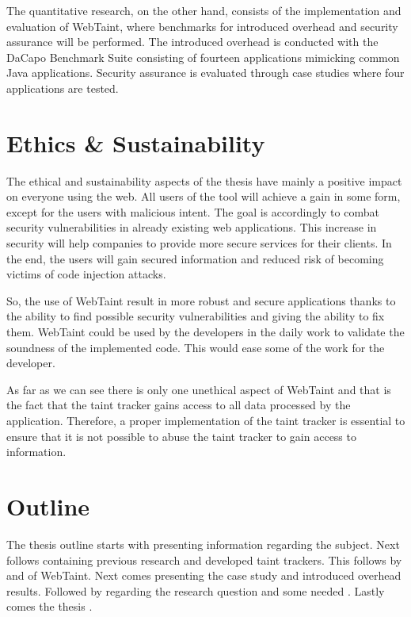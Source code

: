 The quantitative research, on the other hand, consists of the implementation and evaluation of WebTaint, where benchmarks for introduced overhead and security assurance will be performed. The introduced overhead is conducted with the DaCapo Benchmark Suite \parencite{dacapo} consisting of fourteen applications mimicking common Java applications. Security assurance is evaluated through case studies where four applications are tested.



\section{Ethics \& Sustainability}
\label{Ethics}
The ethical and sustainability aspects of the thesis have mainly a positive impact on everyone using the web. All users of the tool will achieve a gain in some form, except for the users with malicious intent. The goal is accordingly to combat security vulnerabilities in already existing web applications. This increase in security will help companies to provide more secure services for their clients. In the end, the users will gain secured information and reduced risk of becoming victims of code injection attacks.

So, the use of WebTaint result in more robust and secure applications thanks to the ability to find possible security vulnerabilities and giving the ability to fix them. WebTaint could be used by the developers in the daily work to validate the soundness of the implemented code. This would ease some of the work for the developer.

As far as we can see there is only one unethical aspect of WebTaint and that is the fact that the taint tracker gains access to all data processed by the application. Therefore, a proper implementation of the taint tracker is essential to ensure that it is not possible to abuse the taint tracker to gain access to information.



\section{Outline}
\label{Outline}
The thesis outline starts with \textit{} presenting information regarding the subject. Next follows \textit{} containing previous research and developed taint trackers. This follows by \textit{} and \textit{} of WebTaint. Next comes \textit{} presenting the case study and introduced overhead results. Followed by \textit{} regarding the research question and some needed \textit{}. Lastly comes the thesis \textit{}.